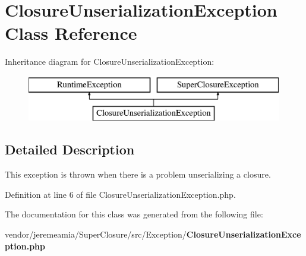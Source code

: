 \section{Closure\+Unserialization\+Exception Class Reference}
\label{class_super_closure_1_1_exception_1_1_closure_unserialization_exception}
Inheritance diagram for Closure\+Unserialization\+Exception\+:\begin{figure}[H]
\begin{center}
\leavevmode
\includegraphics[height=2.000000cm]{class_super_closure_1_1_exception_1_1_closure_unserialization_exception}
\end{center}
\end{figure}


\subsection{Detailed Description}
This exception is thrown when there is a problem unserializing a closure. 

Definition at line 6 of file Closure\+Unserialization\+Exception.\+php.



The documentation for this class was generated from the following file\+:\begin{DoxyCompactItemize}
\item 
vendor/jeremeamia/\+Super\+Closure/src/\+Exception/{\bf Closure\+Unserialization\+Exception.\+php}\end{DoxyCompactItemize}
